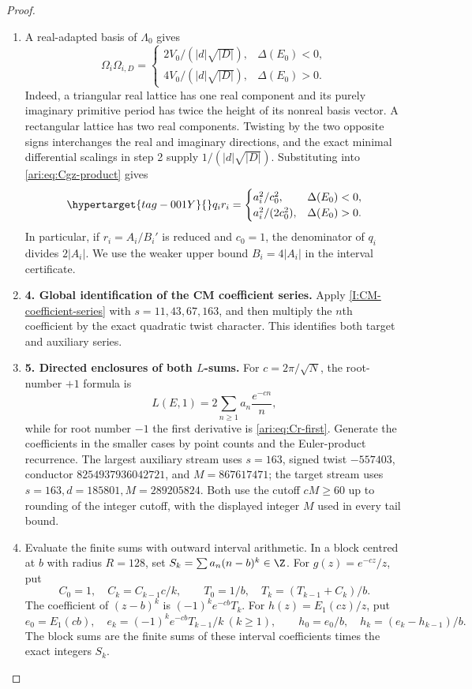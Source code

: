 \begin{proof}
\begin{enumerate}[label=\arabic*.,leftmargin=*]
\item A real-adapted basis of $\Lambda_0$ gives
\[
 \Omega_i\Omega_{i,D}=
 \begin{cases}
 2V_0/(|d|\sqrt{|D|}),&\Delta(E_0)<0,\\
 4V_0/(|d|\sqrt{|D|}),&\Delta(E_0)>0.
 \end{cases}
\]
Indeed, a triangular real lattice has one real component and its
purely imaginary primitive period has twice the height of its
nonreal basis vector. A rectangular lattice has two real
components. Twisting by the two opposite signs interchanges the
real and imaginary directions, and the exact minimal differential
scalings in step 2 supply $1/(|d|\sqrt{|D|})$.
Substituting into \eqref{ari:eq:Cgz-product} gives
\begin{equation}\hypertarget{tag-001Y}{}\label{ari:eq:Cgz-denominator}
 q_ir_i=
 \begin{cases}
 a_i^2/c_0^2,&\Delta(E_0)<0,\\
 a_i^2/(2c_0^2),&\Delta(E_0)>0.
 \end{cases}
\end{equation}
In particular, if $r_i=A_i/B_i'$ is reduced and $c_0=1$, the
denominator of $q_i$ divides $2|A_i|$. We use the weaker upper
bound $B_i=4|A_i|$ in the interval certificate.

\item \textbf{4. Global identification of the CM coefficient series.}
Apply \cref{I:CM-coefficient-series} with $s=11,43,67,163$,
and then multiply the $n$th coefficient by the exact quadratic
twist character. This identifies both target and auxiliary series.

\item \textbf{5. Directed enclosures of both $L$-sums.}
For $c=2\pi/\sqrt N$, the root-number $+1$ formula is
\[
 L(E,1)=2\sum_{n\geq1}a_n\frac{e^{-cn}}n,
\]
while for root number $-1$ the first derivative is
\eqref{ari:eq:Cr-first}. Generate the coefficients in the smaller cases by point counts
and the Euler-product recurrence. The largest auxiliary stream uses
$s=163$, signed twist $-557403$, conductor
$8254937936042721$, and $M=867617471$; the target stream uses
$s=163,d=185801,M=289205824$. Both use the cutoff $cM\geq60$
up to rounding of the integer cutoff, with the displayed integer
$M$ used in every tail bound.

\item Evaluate the finite sums with outward interval arithmetic.
In a block centred at $b$ with radius $R=128$, set
$S_k=\sum a_n(n-b)^k\in\Z$. For $g(z)=e^{-cz}/z$, put
\[
 C_0=1,\quad C_k=C_{k-1}c/k,\qquad
 T_0=1/b,\quad T_k=(T_{k-1}+C_k)/b.
\]
The coefficient of $(z-b)^k$ is $(-1)^ke^{-cb}T_k$.
For $h(z)=E_1(cz)/z$, put
\[
 e_0=E_1(cb),\quad e_k=(-1)^ke^{-cb}T_{k-1}/k\ (k\geq1),
 \qquad h_0=e_0/b,\quad h_k=(e_k-h_{k-1})/b.
\]
The block sums are the finite sums of these interval coefficients
times the exact integers $S_k$.


\end{enumerate}
\end{proof}
